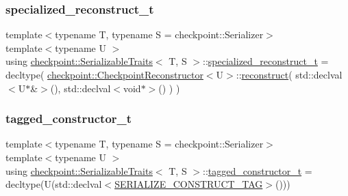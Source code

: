 \mbox{\label{structcheckpoint_1_1_serializable_traits_a914c73251ad840e5370f1ac7cb1c18de}} 
\subsubsection{\texorpdfstring{specialized\+\_\+reconstruct\+\_\+t}{specialized\_reconstruct\_t}}
{\footnotesize\ttfamily template$<$typename T, typename S = checkpoint\+::\+Serializer$>$ \\
template$<$typename U $>$ \\
using \hyperlink{structcheckpoint_1_1_serializable_traits}{checkpoint\+::\+Serializable\+Traits}$<$ T, S $>$\+::\hyperlink{structcheckpoint_1_1_serializable_traits_a914c73251ad840e5370f1ac7cb1c18de}{specialized\+\_\+reconstruct\+\_\+t} =  decltype( \hyperlink{structcheckpoint_1_1_checkpoint_reconstructor}{checkpoint\+::\+Checkpoint\+Reconstructor}$<$U$>$\+::\hyperlink{namespacecheckpoint_a6254f2e220f905a2b0c797c08092a7a1}{reconstruct}( std\+::declval$<$U$\ast$\&$>$(), std\+::declval$<$void$\ast$$>$() ) )}

\mbox{\label{structcheckpoint_1_1_serializable_traits_a5a1f289a5008468335f22e288a96d861}} 
\subsubsection{\texorpdfstring{tagged\+\_\+constructor\+\_\+t}{tagged\_constructor\_t}}
{\footnotesize\ttfamily template$<$typename T, typename S = checkpoint\+::\+Serializer$>$ \\
template$<$typename U $>$ \\
using \hyperlink{structcheckpoint_1_1_serializable_traits}{checkpoint\+::\+Serializable\+Traits}$<$ T, S $>$\+::\hyperlink{structcheckpoint_1_1_serializable_traits_a5a1f289a5008468335f22e288a96d861}{tagged\+\_\+constructor\+\_\+t} =  decltype(U(std\+::declval$<$\hyperlink{namespacecheckpoint_a7ff642cff4d72d01a16ab10e9bc363ef}{S\+E\+R\+I\+A\+L\+I\+Z\+E\+\_\+\+C\+O\+N\+S\+T\+R\+U\+C\+T\+\_\+\+T\+AG}$>$()))}



